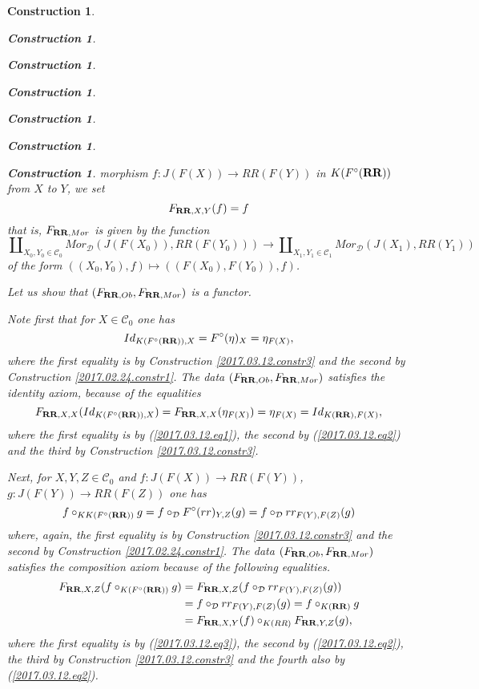 \documentclass[12pt]{amsart}
\numberwithin{proposition}{subsection}
\newtheorem{construction}[proposition]{Construction}
\newcommand{\llabel}[1]{\label{#1}}
\newcommand{\sr}{\rightarrow}
\newcommand{\RR}{{\bf RR}}
\newcommand{\C}{{\mathcal C}}
\newcommand{\D}{{\mathcal D}}
\begin{document}
\begin{construction}
\begin{construction}
\begin{construction}
\begin{construction}
\begin{construction}
\begin{construction}
\begin{construction}
morphism $f:J(F(X))\sr RR(F(Y))$ in $K(F^{\circ}(\RR))$ from $X$ to $Y$, we set
%
\begin{equation}
\llabel{2017.03.12.eq2}
F_{\RR,X,Y}(f)=f
\end{equation}%
%
that is, $F_{\RR,Mor}$ is given by the function
%
$$\amalg_{X_0,Y_0\in\C_0}Mor_{\D}(J(F(X_0)),RR(F(Y_0)))\sr \amalg_{X_1,Y_1\in\C_1}Mor_{\D}(J(X_1),RR(Y_1))$$
%
of the form $((X_0,Y_0),f)\mapsto ((F(X_0),F(Y_0)),f)$. 

Let us show that $(F_{\RR,Ob},F_{\RR,Mor})$ is a functor. 

Note first that for $X\in\C_0$ one has
%
\begin{equation}
\llabel{2017.03.12.eq1}
Id_{K(F^{\circ}(\RR)),X}=F^{\circ}(\eta)_{X}=\eta_{F(X)},
\end{equation}%
%
where the first equality is by Construction \ref{2017.03.12.constr3} and the
second by Construction \ref{2017.02.24.constr1}. The data
$(F_{\RR,Ob},F_{\RR,Mor})$ satisfies the identity axiom, because of the
equalities
%
$$F_{\RR,X,X}(Id_{K(F^{\circ}(\RR)),X})=F_{\RR,X,X}(\eta_{F(X)})=\eta_{F(X)}=Id_{K(\RR),F(X)},$$
%
where the first equality is by (\ref{2017.03.12.eq1}), the second by (\ref{2017.03.12.eq2}) and the third by Construction \ref{2017.03.12.constr3}. 

Next, for $X,Y,Z\in \C_0$ and $f:J(F(X))\sr RR(F(Y))$, $g:J(F(Y))\sr RR(F(Z))$ one has
%
\begin{equation}
\llabel{2017.03.12.eq3}
f\circ_{KK(F^{\circ}(\RR))} g= f\circ_{\D} F^{\circ}(rr)_{Y,Z}(g)=f\circ_{\D} rr_{F(Y),F(Z)}(g)
\end{equation}%
%
where, again, the first equality is by Construction \ref{2017.03.12.constr3}
and the second by Construction \ref{2017.02.24.constr1}. The data
$(F_{\RR,Ob},F_{\RR,Mor})$ satisfies the composition axiom because of the
following equalities.
%
\begin{equation*}
  \begin{split}
    F_{\RR,X,Z}(f\circ_{K(F^{\circ}(\RR))} g)&=F_{\RR,X,Z}(f\circ_{\D} rr_{F(Y),F(Z)}(g)) \\
    &=f\circ_{\D} rr_{F(Y),F(Z)}(g)=f\circ_{K(\RR)}g \\
    &=F_{\RR,X,Y}(f)\circ_{K(RR)}F_{\RR,Y,Z}(g),
  \end{split}
\end{equation*}
%
where the first equality is by (\ref{2017.03.12.eq3}), the second by (\ref{2017.03.12.eq2}), the third by Construction \ref{2017.03.12.constr3} and the fourth also by (\ref{2017.03.12.eq2}). 


\end{construction}
\end{construction}
\end{construction}
\end{construction}
\end{construction}
\end{construction}
\end{construction}
\end{document}
